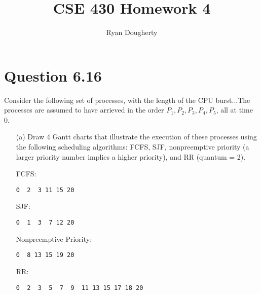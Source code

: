 \documentclass[12pt]{article}
\title{CSE 430 Homework 4}
\author{Ryan Dougherty}
\date{}                                           %
\begin{document}
\maketitle

\section*{Question 6.16} {\color{blue}Consider the following set of processes, with the length of the CPU burst...The processes are assumed to have arrieved in the order $P_{1}, P_{2}, P_{3}, P_{4}, P_{5}$, all at time 0.
\begin{enumerate}
\item[(a)]Draw 4 Gantt charts that illustrate the execution of these processes using the following scheduling algorithms: FCFS, SJF, nonpreemptive priority (a larger priority number implies a higher priority), and RR (quantum = 2).
\\
{\color{black}
FCFS: \\
\begin{verbatim}
0  2  3 11 15 20
\end{verbatim}

SJF: \\
\begin{verbatim}
0  1  3  7 12 20
\end{verbatim}

Nonpreemptive Priority: \\
\begin{verbatim}
0  8 13 15 19 20
\end{verbatim}

RR: \\
\begin{verbatim}
0  2  3  5  7  9  11 13 15 17 18 20
\end{verbatim}

}


\end{enumerate}}
\end{document}
